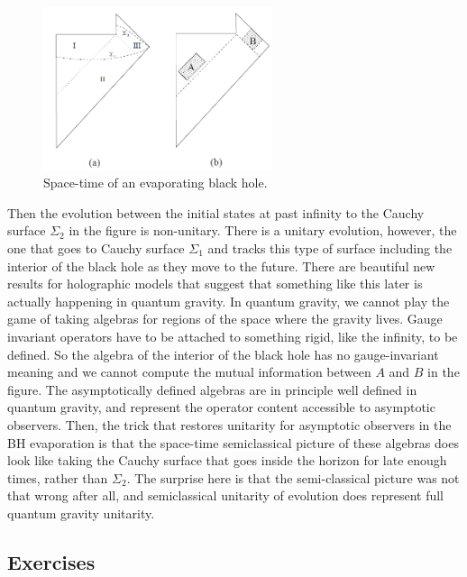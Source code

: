\documentclass[12pt]{article}
\numberwithin{equation}{section}
\begin{document}
\begin{figure}[t]
\begin{center}  
\includegraphics[width=0.6\textwidth]{imagen2.png}
\captionsetup{width=0.9\textwidth}
\caption{Space-time of an evaporating black hole.}
\label{bibo}
\end{center}  
\end{figure}   


Then the evolution between the initial states at past infinity to the Cauchy surface $\Sigma_2$ in the figure is non-unitary. There is a unitary evolution, however, the one that goes to Cauchy surface $\Sigma_1$ and tracks this type of surface including the interior of the black hole as they move to the future. There are beautiful new results for holographic models that suggest that something like this later is actually happening in quantum gravity. In quantum gravity, we cannot play the game of taking algebras for regions of the space where the gravity lives. Gauge invariant operators have to be attached to something rigid, like the infinity, to be defined. So the algebra of the interior of the black hole has no gauge-invariant meaning and we cannot compute the mutual information between $A$ and $B$ in the figure. The asymptotically defined algebras are in principle well defined in quantum gravity, and represent the operator content accessible to asymptotic observers. Then, the trick that restores unitarity for asymptotic observers in the BH evaporation is that the space-time semiclassical picture of these algebras does look like taking the Cauchy surface that goes inside the horizon for late enough times, rather than $\Sigma_2$. The surprise here is that the semi-classical picture was not that wrong after all, and semiclassical unitarity of evolution does represent full quantum gravity unitarity.      

\subsection{Exercises}
\end{document}
